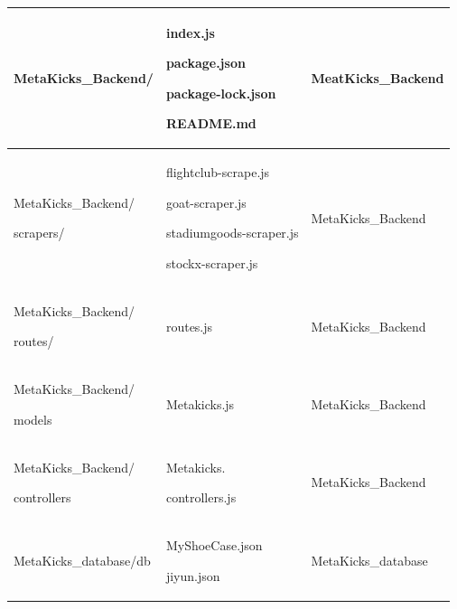 \documentclass[conference]{IEEEtran}
\begin{document}
\begin{table}[h]
\begin{tabular}{|p{2.8cm}|p{2.4cm}|p{2.7cm}|}\hline
	MetaKicks\_Backend/ & index.js \par package.json \par package-lock.json \par README.md \par & MeatKicks\_Backend\\ \hline
	MetaKicks\_Backend/\par scrapers/ & flightclub-scrape.js \par goat-scraper.js \par stadiumgoods-scraper.js \par stockx-scraper.js & MetaKicks\_Backend\\ \hline
	MetaKicks\_Backend/\par routes/ & routes.js & MetaKicks\_Backend\\ \hline
	MetaKicks\_Backend/\par models & Metakicks.js & MetaKicks\_Backend\\ \hline
	MetaKicks\_Backend/\par controllers & Metakicks. \par controllers.js & MetaKicks\_Backend\\ \hline
	MetaKicks\_database/db & MyShoeCase.json \par jiyun.json & MetaKicks\_database\\ \hline
	\end{tabular}
\end{table}
\end{document}
